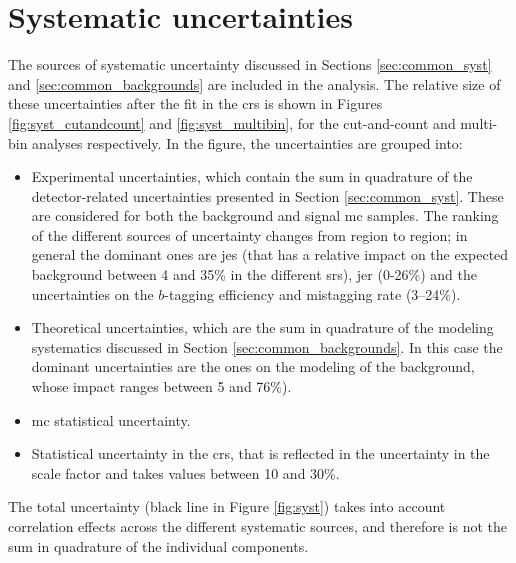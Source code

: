 \section{Systematic uncertainties}
\label{sec:strong:syst}

The sources of systematic uncertainty discussed in Sections \ref{sec:common_syst} and \ref{sec:common_backgrounds} are included in the analysis.
The relative size of these uncertainties after the fit in the \glspl{cr} is shown in Figures \ref{fig:syst_cutandcount} and \ref{fig:syst_multibin},
for the cut-and-count and multi-bin analyses respectively. 
In the figure, the uncertainties are grouped into:
\begin{itemize}
\item Experimental uncertainties, which contain the sum in quadrature of the detector-related uncertainties 
presented in Section \ref{sec:common_syst}. These are considered for both the background and signal \gls{mc} samples.
The ranking of the different sources of uncertainty changes from region to region; in general the dominant ones are \gls{jes} (that has a 
relative impact on the expected background between 4 and 35\% in the different \glspl{sr}), \gls{jer} (0-26\%) and the uncertainties on the 
$b$-tagging efficiency and mistagging rate (3--24\%).

\item Theoretical uncertainties, which are the sum in quadrature of the modeling systematics discussed in Section \ref{sec:common_backgrounds}.
In this case the dominant uncertainties are the ones on the modeling of the \ttbar background, whose impact ranges between 5 and 76\%).

\item \gls{mc} statistical uncertainty.

\item Statistical uncertainty in the \glspl{cr}, that is reflected in the uncertainty in the \ttbar scale factor and takes values between 10 and 30\%.

\end{itemize}

The total uncertainty (black line in Figure \ref{fig:syst}) takes into account correlation effects across the different systematic sources, 
and therefore is not the sum in quadrature of the individual components. 

